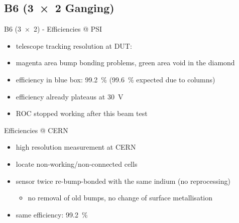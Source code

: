\subsection{B6 (\SI{3x2}{} Ganging)}
\begin{frame}{B6 (\SI{3x2}{}) - Efficiencies @ PSI}

	
	\begin{itemize}\itemfill
		\item telescope tracking resolution at DUT: 
		\item magenta area \ra bump bonding problems, green area \ra void in the diamond
		\item efficiency in blue box: \SI{99.2}{\%} (\ra \SI{99.6}{\%} expected due to columns)
		\item efficiency already plateaus at \SI{30}{\volt}
		\item ROC stopped working after this beam test
	\end{itemize}
	
\end{frame}
% 
% 	
% 	
\begin{frame}{Efficiencies @ CERN}

	\vspace*{-2ex}\vspace*{-2ex}
	
	\begin{itemize}\itemfill
		\item high resolution measurement at CERN
		\item locate non-working/non-connected cells
		\item sensor twice re-bump-bonded with the same indium (no reprocessing)
		\begin{itemize}
			\item no removal of old bumps, no change of surface metallisation
		\end{itemize}
		\item same efficiency: \SI{99.2}{\%}
	\end{itemize}
	
\end{frame}
